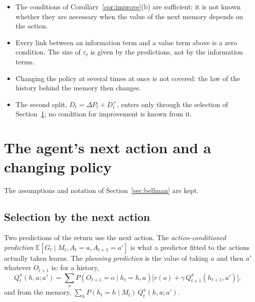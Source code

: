 \documentclass{article}
\theoremstyle{definition}
\theoremstyle{remark}
\newcommand{\E}{\mathbb{E}}
\newcommand{\dP}{\Delta P}
\begin{document}
\begin{itemize}
\item The conditions of Corollary~\ref{cor:improve}(b) are sufficient; it is not known whether they are necessary when the value of the next memory depends on the action.
\item Every link between an information term and a value term above is a zero condition. The size of $\varepsilon_t$ is given by the predictions, not by the information terms.
\item Changing the policy at several times at once is not covered: the law of the history behind the memory then changes.
\item The second split, $D_t=\dP_t+D^+_t$, enters only through the selection of Section~\ref{sec:adapt}; no condition for improvement is known from it.
\end{itemize}

\section{The agent's next action and a changing policy}\label{sec:adapt}

The assumptions and notation of Section~\ref{sec:bellman} are kept.

\subsection{Selection by the next action}

Two predictions of the return use the next action. The \emph{action-conditioned prediction} $\E[G_t\mid M_t,A_t=a,A_{t+1}=a']$ is what a predictor fitted to the actions actually taken learns. The \emph{planning prediction} is the value of taking $a$ and then $a'$ whatever $O_{t+1}$ is: for a history,
\[
Q^\pi_t(h,a;a')=\sum_oP(O_{t+1}=o\mid h_t=h,a)\big[r(o)+\gamma\,Q^\pi_{t+1}(h_{t+1},a')\big],
\]
and from the memory, $\sum_hP(h_t=h\mid M_t)\,Q^\pi_t(h,a;a')$.
\end{document}
